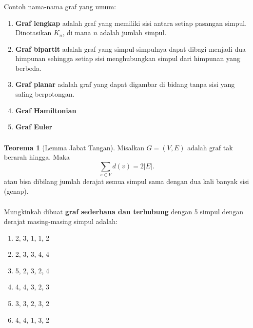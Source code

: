 \documentclass[aspectratio=169]{beamer}
\theoremstyle{definition}
\newtheorem{teorema}{Teorema}
\begin{document}
\begin{frame}
  \frametitle{\insertsection}
  \framesubtitle{\insertsubsection}
  Contoh nama-nama graf yang umum:
  \begin{enumerate}
    \item \textbf{Graf lengkap} adalah graf yang memiliki sisi antara setiap pasangan simpul. Dinotasikan $K_n$, di mana $n$ adalah jumlah simpul.
    \item \textbf{Graf bipartit} adalah graf yang simpul-simpulnya dapat dibagi menjadi dua himpunan sehingga setiap sisi menghubungkan simpul dari himpunan yang berbeda.
    \item \textbf{Graf planar} adalah graf yang dapat digambar di bidang tanpa sisi yang saling berpotongan. 
    \item \textbf{Graf Hamiltonian} 
    \item \textbf{Graf Euler}
  \end{enumerate}
\end{frame}

\begin{frame}
  \frametitle{\insertsection}
  \begin{teorema}[Lemma Jabat Tangan]
    Misalkan $G=(V,E)$ adalah graf tak berarah hingga. Maka 
    \[\sum_{v \in V} d(v) = 2|E|.\]
    atau bisa dibilang jumlah derajat semua simpul sama dengan dua kali banyak sisi (genap).
  \end{teorema}
\end{frame}

\begin{frame}
  \frametitle{\insertsection}
  Mungkinkah dibuat \textbf{graf sederhana dan terhubung} dengan 5 simpul dengan derajat masing-masing simpul adalah:
  \begin{enumerate}
      \item 2, 3, 1, 1, 2
      \item 2, 3, 3, 4, 4
      \item 5, 2, 3, 2, 4
      \item 4, 4, 3, 2, 3
      \item 3, 3, 2, 3, 2
      \item 4, 4, 1, 3, 2
  \end{enumerate}
\end{frame}
\end{document}
